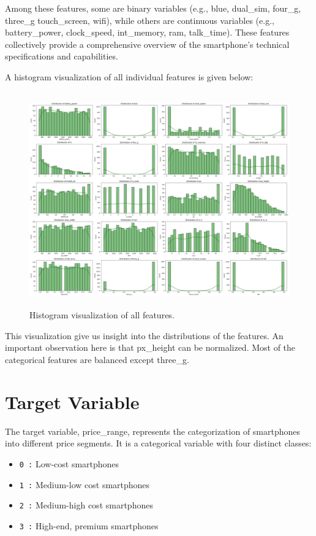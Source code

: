 \documentclass[12pt]{report}
\begin{document}
Among these features, some are binary variables (e.g., blue, dual\_sim, four\_g, three\_g touch\_screen, wifi), while others are continuous variables (e.g., battery\_power, clock\_speed, int\_memory, ram, talk\_time). These features collectively provide a comprehensive overview of the smartphone's technical specifications and capabilities.

A histogram visualization of all individual features is given below:
\begin{figure}[H]
	\centering
	\includegraphics[height=25em]{all_feature_viz.png}
	\caption{Histogram visualization of all features.}
	\label{all_feature_viz}
\end{figure}
This visualization give us insight into the distributions of the features. An important observation here is that px\_height can be normalized. Most of the categorical features are balanced except three\_g.

\section{Target Variable}
The target variable, price\_range, represents the categorization of smartphones into different price segments. It is a categorical variable with four distinct classes:
\vspace{-1.25em}
\begin{itemize}
	\setlength\itemsep{-1.05em}
	\item{\texttt{0 :}} Low-cost smartphones
	\item{\texttt{1 :}} Medium-low cost smartphones
	\item{\texttt{2 :}} Medium-high cost smartphones
	\item{\texttt{3 :}} High-end, premium smartphones
\end{itemize}
\end{document}
